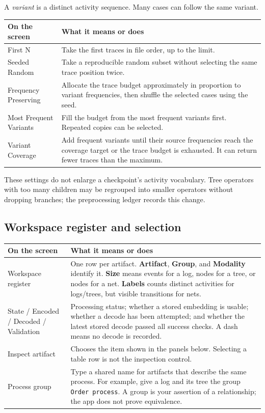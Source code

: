 \documentclass[11pt,a4paper]{article}
\makeatletter
\newcommand{\ui}[1]{\textbf{#1}}
\newcommand{\code}[1]{\nolinkurl{#1}}
\newenvironment{controls}{%
  \small\begin{longtable}{@{}>{\raggedright\arraybackslash}p{.34\linewidth}
    >{\raggedright\arraybackslash}p{.62\linewidth}@{}}
  \toprule\textbf{On the screen} & \textbf{What it means or does}\\\midrule\endhead
  \bottomrule\endfoot
}{\end{longtable}\normalsize}
\makeatother
\begin{document}
A \emph{variant} is a distinct activity sequence. Many cases can follow the
same variant.
\begin{controls}
First N & Take the first traces in file order, up to the limit.\\
Seeded Random & Take a reproducible random subset without selecting the same
trace position twice.\\
Frequency Preserving & Allocate the trace budget approximately in proportion
to variant frequencies, then shuffle the selected cases using the seed.\\
Most Frequent Variants & Fill the budget from the most frequent variants
first. Repeated copies can be selected.\\
Variant Coverage & Add frequent variants until their source frequencies reach
the coverage target or the trace budget is exhausted. It can return fewer
traces than the maximum.\\
\end{controls}

These settings do not enlarge a checkpoint's activity vocabulary. Tree
operators with too many children may be regrouped into smaller operators
without dropping branches; the preprocessing ledger records this change.

\subsection{Workspace register and selection}
\begin{controls}
Workspace register & One row per artifact. \ui{Artifact}, \ui{Group}, and
\ui{Modality} identify it. \ui{Size} means events for a log, nodes for a tree,
or nodes for a net. \ui{Labels} counts distinct activities for logs/trees,
but visible transitions for nets.\\
State / Encoded / Decoded / Validation & Processing status; whether a stored
embedding is usable; whether a decode has been attempted; and whether the latest
stored decode passed all success checks. A dash means no decode is recorded.\\
Inspect artifact & Chooses the item shown in the panels below. Selecting a
table row is not the inspection control.\\
Process group & Type a shared name for artifacts that describe the same process.
For example, give a log and its tree the group \code{Order process}. A group
is your assertion of a relationship; the app does not prove equivalence.\\
\end{controls}
\end{document}
